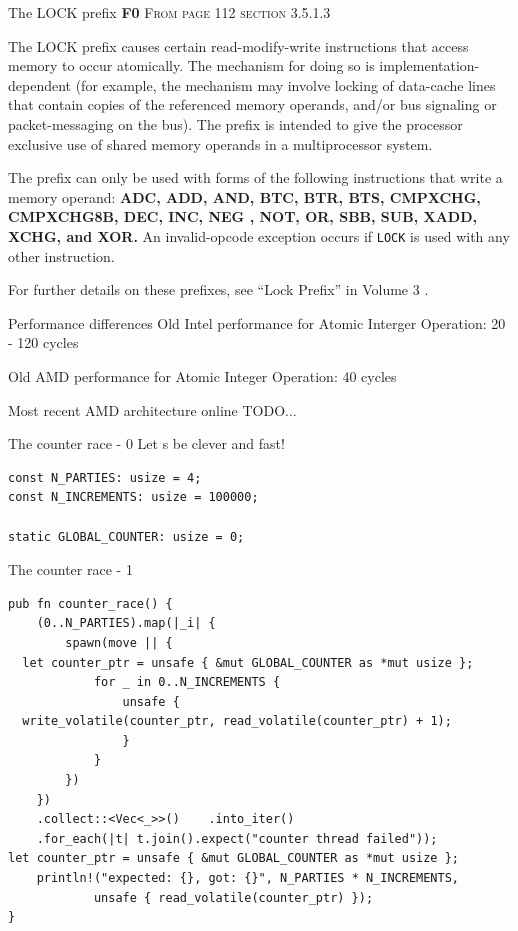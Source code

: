 \documentclass[10pt,aspectratio=169]{beamer}
\begin{document}
\begin{frame}{The LOCK prefix \textbf{F0}}
    \textsc{From page 112 section 3.5.1.3 \cite{AMD64ArchVol1}}

    The LOCK prefix causes certain
read-modify-write instructions that access memory to occur atomically.
The mechanism for doing so is \alert{implementation-dependent} (for example, the mechanism
may involve \alert{locking} of \alert{data-cache lines} that contain copies of
the referenced memory operands, and/or \alert{bus signaling} or packet-messaging on the bus).
The prefix is intended to give the processor exclusive use of shared memory
operands in a multiprocessor system.

The prefix can only be used with forms of the following instructions that write a memory operand:
\textbf{ADC, ADD, AND, BTC, BTR, BTS, CMPXCHG, CMPXCHG8B, DEC, INC, NEG
, NOT, OR, SBB, SUB, XADD, XCHG, and XOR.}
An invalid-opcode exception occurs if
\texttt{LOCK} is used with any other instruction.

For further details on these prefixes, see “Lock Prefix” in Volume 3 \cite{AMD64ArchVol3}.
\end{frame}

\begin{frame}{Performance differences}
    Old Intel performance for Atomic Interger Operation: 20 - 120 cycles

    Old AMD performance for Atomic Integer Operation: 40  cycles

    Most recent AMD architecture\cite{AMD64ArchVol1} online TODO...
\end{frame}


\begin{frame}[fragile]{The counter race - 0}
Let s be clever and fast!
\begin{verbatim}
const N_PARTIES: usize = 4;
const N_INCREMENTS: usize = 100000;

static GLOBAL_COUNTER: usize = 0;
\end{verbatim}
\end{frame}

\begin{frame}[fragile]{The counter race - 1}
\begin{verbatim}
pub fn counter_race() {
    (0..N_PARTIES).map(|_i| {
        spawn(move || {
  let counter_ptr = unsafe { &mut GLOBAL_COUNTER as *mut usize };
            for _ in 0..N_INCREMENTS {
                unsafe {
  write_volatile(counter_ptr, read_volatile(counter_ptr) + 1);
                }
            }
        })
    })
    .collect::<Vec<_>>()    .into_iter()
    .for_each(|t| t.join().expect("counter thread failed"));
let counter_ptr = unsafe { &mut GLOBAL_COUNTER as *mut usize };
    println!("expected: {}, got: {}", N_PARTIES * N_INCREMENTS,
            unsafe { read_volatile(counter_ptr) });
}
\end{verbatim}
\end{frame}
\end{document}
